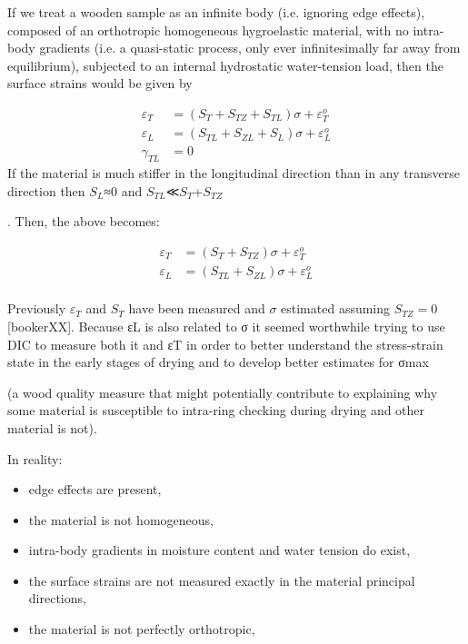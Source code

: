If we treat a wooden sample as an infinite body (i.e. ignoring edge effects), composed of an orthotropic homogeneous hygroelastic material, with no intra-body gradients (i.e. a quasi-static process, only ever infinitesimally far away from equilibrium), subjected to an internal hydrostatic water-tension load, then the surface strains would be given by

\begin {eqnarray}
\varepsilon_T &=(S_T+S_{TZ}+S_{TL}) \sigma +\varepsilon^o_T\\
\varepsilon_L &=(S_{TL}+S_{ZL}+S_L) \sigma +\varepsilon^o_L\\
\gamma_{TL} &=0
\end{eqnarray}
If the material is much stiffer in the longitudinal direction than in any transverse direction then $S_L$≈0
and $S_{TL}$≪$S_T$+$S_{TZ}$

. Then, the above becomes:

\begin {eqnarray}
\varepsilon_T &=(S_T+S_{TZ}) \sigma +\varepsilon^o_T\\
\varepsilon_L &=(S_{TL}+S_{ZL}) \sigma +\varepsilon^o_L\\
\end{eqnarray}

Previously $\varepsilon_T$ and $S_T$ have been measured and $\sigma$ estimated assuming $S_{TZ}=0$ [bookerXX]. Because εL is also related to σ it seemed worthwhile trying to use DIC to measure both it and εT in order to better understand the stress-strain state in the early stages of drying and to develop better estimates for σmax

(a wood quality measure that might potentially contribute to explaining why some material is susceptible to intra-ring checking during drying and other material is not).

In reality:

   \begin{itemize}
\item  edge effects are present,
\end{itemize}
\begin{itemize}
\item     the material is not homogeneous,
\end{itemize}
\begin{itemize}
\item     intra-body gradients in moisture content and water tension do exist,
\end{itemize}
\begin{itemize}
\item     the surface strains are not measured exactly in the material principal directions,
\end{itemize}
\begin{itemize}
\item     the material is not perfectly orthotropic,
\end{itemize}